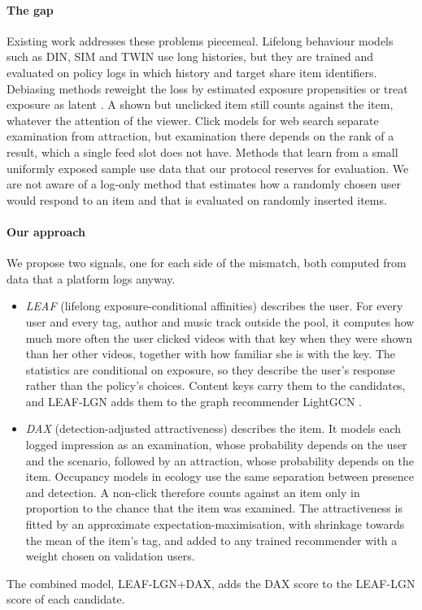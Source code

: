 \paragraph{The gap} Existing work addresses these problems piecemeal. Lifelong behaviour models such as DIN, SIM and TWIN
\citep{zhou2018din,pi2020sim,chang2023twin} use long histories, but they are trained and evaluated on policy logs in which history
and target share item identifiers. Debiasing methods reweight the loss by estimated exposure propensities
\citep{saito2020unbiased,joachims2017unbiased} or treat exposure as latent \citep{liang2016exposure}. A shown but unclicked item still
counts against the item, whatever the attention of the viewer. Click models for web search \citep{richardson2007predicting,
craswell2008cascade,chuklin2015clickmodels} separate examination from attraction, but examination there depends on the rank of
a result, which a single feed slot does not have. Methods that learn from a small uniformly exposed sample
\citep{chen2021autodebias} use data that our protocol reserves for evaluation. We are not aware of a log-only method that estimates
how a randomly chosen user would respond to an item and that is evaluated on randomly inserted items.

\paragraph{Our approach} We propose two signals, one for each side of the mismatch, both computed from data that a platform logs anyway.
\begin{itemize}
\item \emph{LEAF} (lifelong exposure-conditional affinities) describes the user. For every user and every tag, author and music
  track outside the pool, it computes how much more often the user clicked videos with that key when they were shown than her other
  videos, together with how familiar she is with the key. The statistics are conditional on exposure, so they describe the user's
  response rather than the policy's choices. Content keys carry them to the candidates, and LEAF-LGN adds them to the graph
  recommender LightGCN \citep{he2020lightgcn}.
\item \emph{DAX} (detection-adjusted attractiveness) describes the item. It models each logged impression as an examination, whose
  probability depends on the user and the scenario, followed by an attraction, whose probability depends on the item. Occupancy
  models in ecology \citep{mackenzie2002occupancy} use the same separation between presence and detection. A non-click therefore
  counts against an item only in proportion to the chance that the item was examined. The attractiveness is fitted by an
  approximate expectation-maximisation, with shrinkage towards the mean of the item's tag, and added to any trained recommender with a weight
  chosen on validation users.
\end{itemize}
The combined model, LEAF-LGN+DAX, adds the DAX score to the LEAF-LGN score of each candidate.

